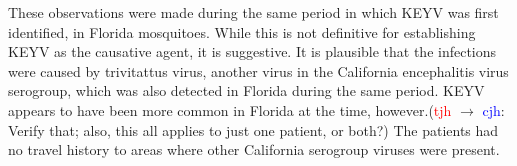 \documentclass[12pt]{article}
\newcommand{\cjh}{\textcolor{blue}{cjh}}
\newcommand{\tjh}{\textcolor{red}{tjh}}
\newcommand{\jal}{\textcolor{green}{jal}}
\newcommand{\jgm}{\textcolor{purple}{jgm}}
\newcommand{\msg}[3]{(#1 $\rightarrow$ #2: #3)}
\newcommand{\mcc}[1]{\msg\cjh\cjh{#1}}
\newcommand{\mct}[1]{\msg\cjh\tjh{#1}}
\newcommand{\mtc}[1]{\msg\tjh\cjh{#1}}
\newcommand{\mjc}[1]{\msg\jal\cjh{#1}}
\newcommand{\mgc}[1]{\msg\jgm\cjh{#1}}
\begin{document}
    These observations were made during the same period in which KEYV was first identified, in Florida mosquitoes.\cite{bond1966california} %
    While this is not definitive for establishing KEYV as the causative agent, it is suggestive.  It is plausible that the infections were caused by trivitattus virus, another virus in the California encephalitis virus serogroup, which was also detected in Florida during the same period. KEYV appears to have been more common in Florida at the time, however.\mtc{Verify that; also, this all applies to just one patient, or both?}  The patients had no travel history to areas where other California serogroup viruses were present.
    
\end{document}
